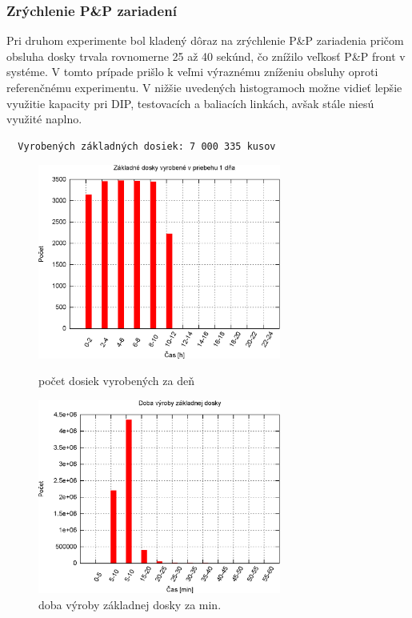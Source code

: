 \documentclass[12pt,a4paper,titlepage,final]{article}
\begin{document}
\subsubsection{Zrýchlenie P\&P zariadení}
Pri druhom experimente bol kladený dôraz na zrýchlenie P\&P zariadenia 
pričom obsluha dosky trvala rovnomerne 25 až 40 sekúnd, čo 
znížilo veľkosť P\&P front v systéme. V tomto prípade prišlo k veľmi
výraznému zníženiu obsluhy oproti referenčnému experimentu. V nižšie uvedených 
histogramoch možne vidieť lepšie využitie kapacity pri DIP, testovacích a baliacích
linkách, avšak stále niesú využité naplno. 

\begin{verbatim}
  Vyrobených základných dosiek: 7 000 335 kusov
\end{verbatim}

\begin{figure}[!h]
  \centering
  \begin{minipage}{0.45\linewidth}
  \centering
  \includegraphics[width=8cm]{doc/2_hist1.eps}
  \caption{počet dosiek vyrobených za deň}
  \end{minipage}
  \quad
  \begin{minipage}{0.45\linewidth}
    \centering
    \includegraphics[width=8cm]{doc/2_hist2.eps}
    \caption{doba výroby základnej dosky za min.}
  \end{minipage}
\end{figure}
\end{document}
